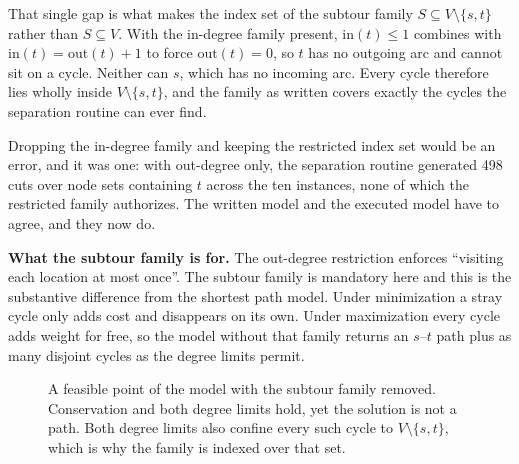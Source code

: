 \documentclass[11pt]{article}
\begin{document}
That single gap is what makes the index set of the subtour family
$S \subseteq V \setminus \{s,t\}$ rather than $S \subseteq V$. With the
in-degree family present, $\mathrm{in}(t) \le 1$ combines with
$\mathrm{in}(t) = \mathrm{out}(t) + 1$ to force $\mathrm{out}(t) = 0$, so
$t$ has no outgoing arc and cannot sit on a cycle. Neither can $s$, which
has no incoming arc. Every cycle therefore lies wholly inside
$V \setminus \{s,t\}$, and the family as written covers exactly the cycles
the separation routine can ever find.

Dropping the in-degree family and keeping the restricted index set would
be an error, and it was one: with out-degree only, the separation routine
generated 498 cuts over node sets containing $t$ across the ten
instances, none of which the restricted family authorizes. The written
model and the executed model have to agree, and they now do.

\textbf{What the subtour family is for.}\quad
The out-degree restriction enforces ``visiting each location at most
once''. The subtour family is mandatory here and this is the substantive
difference from the shortest path model. Under minimization a stray cycle
only adds cost and disappears on its own. Under maximization every cycle
adds weight for free, so the model without that family returns an
$s$--$t$ path plus as many disjoint cycles as the degree limits permit.

\begin{figure}[htbp]
\centering
{}
\caption{A feasible point of the model with the subtour family removed.
Conservation and both degree limits hold, yet the solution is not a
path. Both degree limits also confine every such cycle to
$V \setminus \{s,t\}$, which is why the family is indexed over that set.}
\end{figure}
\end{document}
